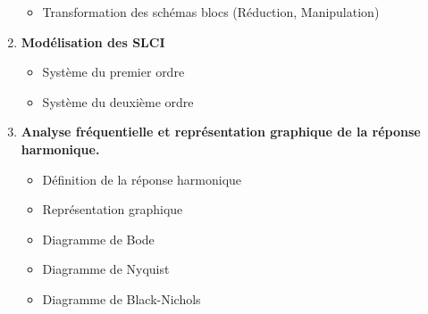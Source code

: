 \documentclass[a4paper,11pt]{article}
\begin{document}
\begin{enumerate}
\begin{itemize}
            \item Transformation des schémas blocs (Réduction, Manipulation)
        \end{itemize}
    \item \textbf{Modélisation des SLCI}
        \begin{itemize}
            \item Système du premier ordre
            \item Système du deuxième ordre
        \end{itemize}
    \item \textbf{Analyse fréquentielle et représentation graphique de la réponse harmonique.}
        \begin{itemize}
            \item Définition de la réponse harmonique
            \item Représentation graphique
            \item Diagramme de Bode
            \item Diagramme de Nyquist
            \item Diagramme de Black-Nichols
        \end{itemize}
\end{enumerate}
\end{document}

